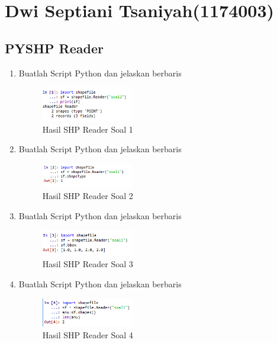 \section{Dwi Septiani Tsaniyah(1174003)}
\subsection{PYSHP Reader}
\begin{enumerate}
    \item Buatlah Script Python dan jelaskan berbaris
    
    \hfill\break
    \begin{figure}[H]
		\includegraphics[width=4cm]{figures/1174003/3/1.png}
		\centering
		\caption{Hasil SHP Reader Soal 1}
    \end{figure}
    
    \item Buatlah Script Python dan jelaskan berbaris
    
    \hfill\break
    \begin{figure}[H]
		\includegraphics[width=4cm]{figures/1174003/3/2.png}
		\centering
		\caption{Hasil SHP Reader Soal 2}
    \end{figure}
    
    \item Buatlah Script Python dan jelaskan berbaris
    
    \hfill\break
    \begin{figure}[H]
		\includegraphics[width=4cm]{figures/1174003/3/3.png}
		\centering
		\caption{Hasil SHP Reader Soal 3}
    \end{figure}
    
    \item Buatlah Script Python dan jelaskan berbaris
    
    \hfill\break
    \begin{figure}[H]
		\includegraphics[width=4cm]{figures/1174003/3/4.png}
		\centering
		\caption{Hasil SHP Reader Soal 4}
    \end{figure}
    

\end{enumerate}
